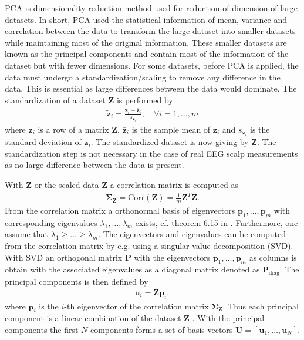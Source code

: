 PCA is dimensionality reduction method used for reduction of dimension of large datasets. 
In short, PCA used the statistical information of mean, variance and correlation between the data to transform the large dataset into smaller datasets while maintaining most of the original information. 
These smaller datasets are known as the principal components and contain most of the information of the dataset but with fewer dimensions. 
For some datasets, before PCA is applied, the data must undergo a standardization/scaling to remove any difference in the data. 
This is essential as large differences between the data would dominate. The standardization of a dataset $\mathbf{Z}$ is performed by
\begin{align*}
\tilde{\mathbf{z}}_i = \frac{\mathbf{z}_i - \bar{\mathbf{z}}_i}{s_{\mathbf{z}_i}}, \quad \forall i = 1, \dots, m
\end{align*}
where $\mathbf{z}_i$ is a row of a matrix $\mathbf{Z}$, $\bar{\mathbf{z}}_i$ is the sample mean of $\mathbf{z}_i$ and $s_{\mathbf{z}_i}$ is the standard deviation of $\mathbf{z}_i$. 
The standardized dataset is now giving by $\tilde{\mathbf{Z}}$. 
The standardization step is not necessary in the case of real EEG scalp measurements as no large difference between the data is present.

With $\mathbf{Z}$ or the scaled data $\tilde{\mathbf{Z}}$ a correlation matrix is computed as
\begin{align*}
\boldsymbol{\Sigma}_{\mathbf{Z}} = \text{Corr}(\mathbf{Z}) = \frac{1}{m} \mathbf{Z}^T \mathbf{Z}.
\end{align*}
From the correlation matrix a orthonormal basis of eigenvectors $\mathbf{p}_1, \dots, \mathbf{p}_m$ with corresponding eigenvalues $\lambda_1, \dots, \lambda_m$ exists, cf. theorem 6.15 in \cite[p. 375]{PCA}. Furthermore, one assume that $\lambda_1 \geq \dots \geq \lambda_m$. 
The eigenvectors and eigenvalues can be computed from the correlation matrix by e.g. using a singular value decomposition (SVD). With SVD an orthogonal matrix $\mathbf{P}$ with the eigenvectors $\mathbf{p}_1, \dots, \mathbf{p}_m$ as columns is obtain with the associated eigenvalues as a diagonal matrix denoted as $\mathbf{P}_{\text{diag}}$.
The principal components is then defined by
\begin{align*}
\mathbf{u}_i = \mathbf{Z} \mathbf{p}_i,
\end{align*}
where $\mathbf{p}_i$ is the $i$-th eigenvector of the correlation matrix $\boldsymbol{\Sigma}_{\mathbf{Z}}$. 
Thus each principal component is a linear combination of the dataset $\mathbf{Z}$ \cite[p. 460] {PCA}. 
With the principal components the first $N$ components forms a set of basis vectors $\mathbf{U} = [\mathbf{u}_1, \dots, \mathbf{u}_N]$.


